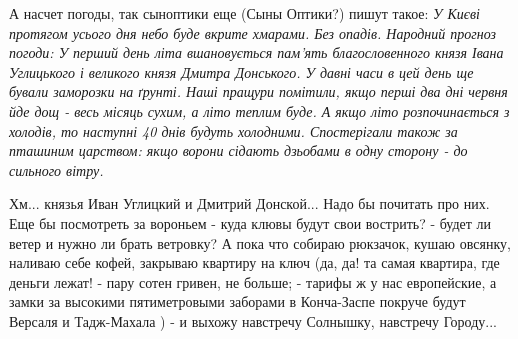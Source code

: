 А насчет погоды, так сыноптики еще (Сыны Оптики?) пишут такое: \emph{У Києві
протягом усього дня небо буде вкрите хмарами.  Без опадів. Народний прогноз
погоди: У перший день літа вшановується пам'ять благословенного князя Івана
Углицького і великого князя Дмитра Донського. У давні часи в цей день ще бували
заморозки на ґрунті.  Наші пращури помітили, якщо перші два дні червня йде дощ
- весь місяць сухим, а літо теплим буде. А якщо літо розпочинається з холодів,
то наступні 40 днів будуть холодними.  Спостерігали також за пташиним царством:
якщо ворони сідають дзьобами в одну сторону - до сильного вітру.}

Хм... князья Иван Углицкий и Дмитрий Донской... Надо бы почитать про них. Еще
бы посмотреть за вороньем - куда клювы будут свои вострить? - будет ли ветер и
нужно ли брать ветровку?  А пока что собираю рюкзачок, кушаю овсянку, наливаю
себе кофей, закрываю квартиру на ключ (да, да!  та самая квартира, где деньги
лежат! - пару сотен гривен, не больше; - тарифы ж у нас европейские, а замки за
высокими пятиметровыми заборами в Конча-Заспе покруче будут Версаля и
Тадж-Махала ) - и выхожу навстречу Солнышку, навстречу Городу... 
